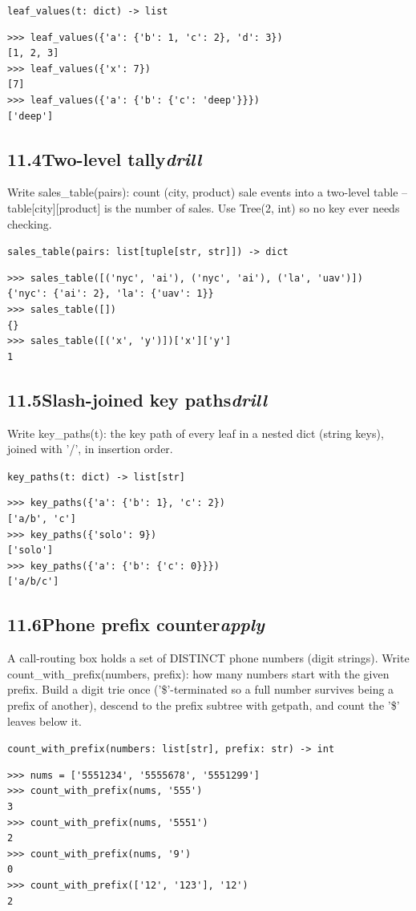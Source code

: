 \documentclass[10pt,letterpaper]{book}
\begin{document}
\noindent\texttt{leaf\_values(t: dict) -> list}
\begin{lstlisting}[style=ex]
>>> leaf_values({'a': {'b': 1, 'c': 2}, 'd': 3})
[1, 2, 3]
>>> leaf_values({'x': 7})
[7]
>>> leaf_values({'a': {'b': {'c': 'deep'}}})
['deep']
\end{lstlisting}
\subsection*{11.4\quad Two-level tally\hfill\textnormal{\textit{drill}}}
Write sales\_table(pairs): count (city, product) sale events into a two-level table -- table[city][product] is the number of sales. Use Tree(2, int) so no key ever needs checking.

\noindent\texttt{sales\_table(pairs: list[tuple[str, str]]) -> dict}
\begin{lstlisting}[style=ex]
>>> sales_table([('nyc', 'ai'), ('nyc', 'ai'), ('la', 'uav')])
{'nyc': {'ai': 2}, 'la': {'uav': 1}}
>>> sales_table([])
{}
>>> sales_table([('x', 'y')])['x']['y']
1
\end{lstlisting}
\subsection*{11.5\quad Slash-joined key paths\hfill\textnormal{\textit{drill}}}
Write key\_paths(t): the key path of every leaf in a nested dict (string keys), joined with '/', in insertion order.

\noindent\texttt{key\_paths(t: dict) -> list[str]}
\begin{lstlisting}[style=ex]
>>> key_paths({'a': {'b': 1}, 'c': 2})
['a/b', 'c']
>>> key_paths({'solo': 9})
['solo']
>>> key_paths({'a': {'b': {'c': 0}}})
['a/b/c']
\end{lstlisting}
\subsection*{11.6\quad Phone prefix counter\hfill\textnormal{\textit{apply}}}
A call-routing box holds a set of DISTINCT phone numbers (digit strings). Write count\_with\_prefix(numbers, prefix): how many numbers start with the given prefix. Build a digit trie once ('\$'-terminated so a full number survives being a prefix of another), descend to the prefix subtree with getpath, and count the '\$' leaves below it.

\noindent\texttt{count\_with\_prefix(numbers: list[str], prefix: str) -> int}
\begin{lstlisting}[style=ex]
>>> nums = ['5551234', '5555678', '5551299']
>>> count_with_prefix(nums, '555')
3
>>> count_with_prefix(nums, '5551')
2
>>> count_with_prefix(nums, '9')
0
>>> count_with_prefix(['12', '123'], '12')
2
\end{lstlisting}
\end{document}
